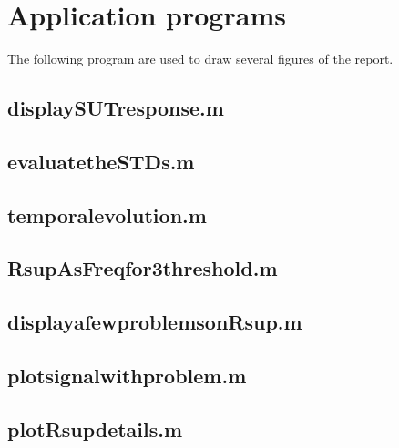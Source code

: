 {{{{{ \clearpage
\section{Application programs}
The following program are used to draw several figures of the report.

\subsection{displaySUTresponse.m}
{\tiny }

  \clearpage
\subsection{evaluatetheSTDs.m}
{\tiny }

 \clearpage
\subsection{temporalevolution.m}
{\tiny }

 \clearpage
\subsection{RsupAsFreqfor3threshold.m}
{\tiny }

 \clearpage
\subsection{displayafewproblemsonRsup.m}
{\tiny }

 \clearpage
\subsection{plotsignalwithproblem.m}
{\tiny }

 \clearpage
\subsection{plotRsupdetails.m}
{\tiny }


}}}}}

